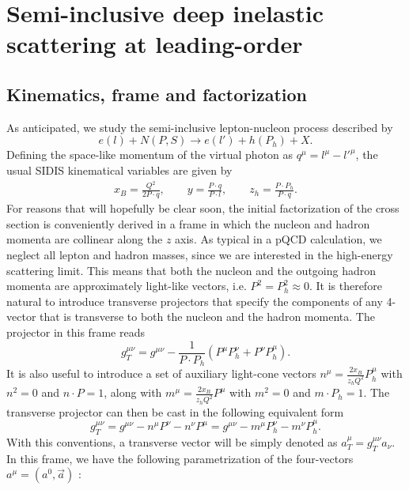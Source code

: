 
\chapter{Semi-inclusive deep inelastic scattering at leading-order}
\section{Kinematics, frame and factorization}
\noindent As anticipated, we study the semi-inclusive lepton-nucleon process described by
\begin{equation}
    e(l)+N(P,S) \longrightarrow e(l')+h(P_h)+X .
\end{equation}
Defining the space-like momentum of the virtual photon as $q^\mu=l^\mu-l'^\mu$, the usual SIDIS kinematical variables are given by
\begin{equation}
    \begin{aligned}
        x_B=\frac{Q^2}{2P\cdot q},\qquad y=\frac{P\cdot q}{P\cdot l},\qquad z_h=\frac{P\cdot P_h}{P\cdot q}.
    \end{aligned}
\end{equation}
For reasons that will hopefully be clear soon, the initial factorization of the cross section is conveniently derived in a frame in which the nucleon and hadron momenta are collinear along the $z$ axis. As typical in a pQCD calculation, we neglect all lepton and hadron masses, since we are interested in the high-energy scattering limit. This means that both the nucleon and the outgoing hadron momenta are approximately light-like vectors, i.e. $P^2=P_h^2\approx0$. It is therefore natural to introduce transverse projectors that specify the components of any 4-vector that is transverse to both the nucleon and the hadron momenta. The projector in this frame reads
\begin{equation}
    g_T^{\mu\nu}=g^{\mu\nu}-\frac{1}{P\cdot P_h}(P^\mu P_h^\nu+P^\nu P_h^\mu).
\end{equation}
It is also useful to introduce a set of auxiliary light-cone vectors $n^\mu=\frac{2x_B}{z_hQ^2}P_h^\mu$ with $n^2=0$ and $n\cdot P=1$, along with $m^\mu=\frac{2x_B}{z_hQ^2}P^\mu$ with $m^2=0$ and $m\cdot P_h=1$. The transverse projector can then be cast in the following equivalent form
\begin{equation}
    g^{\mu\nu}_T=g^{\mu\nu}-n^\mu P^\nu - n^\nu P^\mu=g^{\mu\nu}-m^\mu P_h^\nu - m^\nu P_h^\mu.
\end{equation}
With this conventions, a transverse vector will be simply denoted as $a_T^\mu=g^{\mu\nu}_Ta_\nu$. In this frame, we have the following parametrization of the four-vectors $a^\mu=(a^0,\vec a)$ \cite{}:
